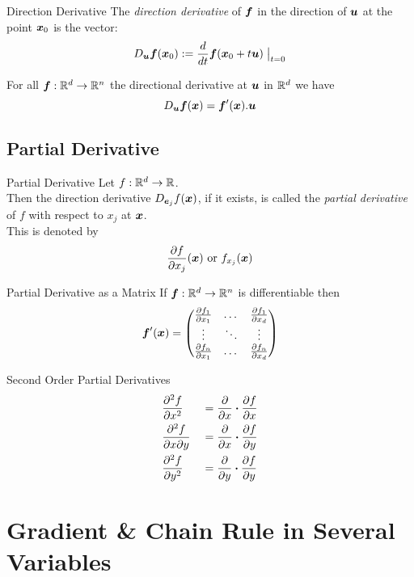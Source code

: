 \documentclass[11pt,a4paper]{article}
\begin{document}
\subtitle{Defintion 10.03 - }{Direction Derivative}
The \textit{direction derivative} of $\boldsymbol{f}$ in the direction of $\boldsymbol{u}$ at the point $\boldsymbol{x}_0$ is the vector:
$$D_{\boldsymbol{u}}\boldsymbol{f}(\boldsymbol{x}_0) := \frac{d}{dt} \boldsymbol{f}(\boldsymbol{x}_0 + t\boldsymbol{u})\bigm|_{t=0}$$

\subtitle{Theorem 10.04}{}
For all $\boldsymbol{f} : \mathbb{R}^d \to \mathbb{R}^n$ the directional derivative at $\boldsymbol{u}$ in $\mathbb{R}^d$ we have
$$D_{\boldsymbol{u}} \boldsymbol{f} (\boldsymbol{x}) = \boldsymbol{f}'(\boldsymbol{x}).\boldsymbol{u}$$

\subsection{Partial Derivative}

\subtitle{Defintion 10.05 - }{Partial Derivative}
Let $f : \mathbb{R}^d \to \mathbb{R}$.\\
Then the direction derivative $D_{\boldsymbol{e}_j}f(\boldsymbol{x})$, if it exists, is called the \textit{partial derivative} of $f$ with respect to $x_j$ at $\boldsymbol{x}$.\\
This is denoted by $$\frac{\partial f}{\partial x_j}(\boldsymbol{x}) \mathrm{\ or\ } f_{x_j}(\boldsymbol{x})$$

\subtitle{Proposition 10.06 - }{Partial Derivative as a Matrix}
If $\boldsymbol{f} : \mathbb{R}^d \to \mathbb{R}^n$ is differentiable then
$$\boldsymbol{f}'(\boldsymbol{x}) = \begin{pmatrix}
\frac{\partial f_1}{\partial x_1} & \dots & \frac{\partial f_1}{\partial x_d} \\
\vdots & \ddots & \vdots \\
\frac{\partial f_n}{\partial x_1} & \dots & \frac{\partial f_n}{\partial x_d}
\end{pmatrix}$$

\subtitle{Remark 10.07 - }{Second Order Partial Derivatives}
\begin{alignat*}{2}
  &\frac{\partial^2 f}{\partial x^2} &&= \frac{\partial}{\partial x} \boldsymbol{\cdot} \frac{\partial f}{\partial x} \\
  &\frac{\partial^2 f}{\partial x \partial y} &&= \frac{\partial}{\partial x} \boldsymbol{\cdot} \frac{\partial f}{\partial y} \\
  &\frac{\partial^2 f}{\partial y^2} &&= \frac{\partial}{\partial y} \boldsymbol{\cdot} \frac{\partial f}{\partial y}
\end{alignat*}

\section{Gradient \& Chain Rule in Several Variables}
%
\end{document}
